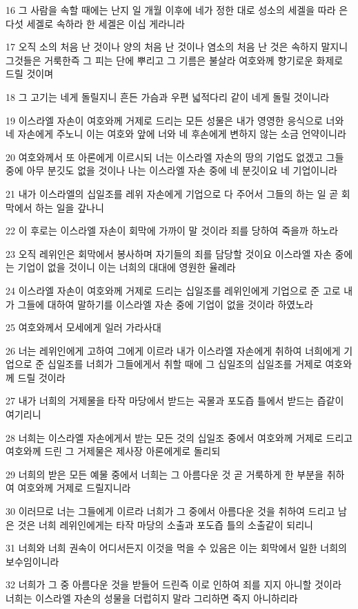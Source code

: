 \par 16 그 사람을 속할 때에는 난지 일 개월 이후에 네가 정한 대로 성소의 세겔을 따라 은 다섯 세겔로 속하라 한 세겔은 이십 게라니라
\par 17 오직 소의 처음 난 것이나 양의 처음 난 것이나 염소의 처음 난 것은 속하지 말지니 그것들은 거룩한즉 그 피는 단에 뿌리고 그 기름은 불살라 여호와께 향기로운 화제로 드릴 것이며
\par 18 그 고기는 네게 돌릴지니 흔든 가슴과 우편 넓적다리 같이 네게 돌릴 것이니라
\par 19 이스라엘 자손이 여호와께 거제로 드리는 모든 성물은 내가 영영한 응식으로 너와 네 자손에게 주노니 이는 여호와 앞에 너와 네 후손에게 변하지 않는 소금 언약이니라
\par 20 여호와께서 또 아론에게 이르시되 너는 이스라엘 자손의 땅의 기업도 없겠고 그들 중에 아무 분깃도 없을 것이나 나는 이스라엘 자손 중에 네 분깃이요 네 기업이니라
\par 21 내가 이스라엘의 십일조를 레위 자손에게 기업으로 다 주어서 그들의 하는 일 곧 회막에서 하는 일을 갚나니
\par 22 이 후로는 이스라엘 자손이 회막에 가까이 말 것이라 죄를 당하여 죽을까 하노라
\par 23 오직 레위인은 회막에서 봉사하며 자기들의 죄를 담당할 것이요 이스라엘 자손 중에는 기업이 없을 것이니 이는 너희의 대대에 영원한 율례라
\par 24 이스라엘 자손이 여호와께 거제로 드리는 십일조를 레위인에게 기업으로 준 고로 내가 그들에 대하여 말하기를 이스라엘 자손 중에 기업이 없을 것이라 하였노라
\par 25 여호와께서 모세에게 일러 가라사대
\par 26 너는 레위인에게 고하여 그에게 이르라 내가 이스라엘 자손에게 취하여 너희에게 기업으로 준 십일조를 너희가 그들에게서 취할 때에 그 십일조의 십일조를 거제로 여호와께 드릴 것이라
\par 27 내가 너희의 거제물을 타작 마당에서 받드는 곡물과 포도즙 틀에서 받드는 즙같이 여기리니
\par 28 너희는 이스라엘 자손에게서 받는 모든 것의 십일조 중에서 여호와께 거제로 드리고 여호와께 드린 그 거제물은 제사장 아론에게로 돌리되
\par 29 너희의 받은 모든 예물 중에서 너희는 그 아름다운 것 곧 거룩하게 한 부분을 취하여 여호와께 거제로 드릴지니라
\par 30 이러므로 너는 그들에게 이르라 너희가 그 중에서 아름다운 것을 취하여 드리고 남은 것은 너희 레위인에게는 타작 마당의 소출과 포도즙 틀의 소출같이 되리니
\par 31 너희와 너희 권속이 어디서든지 이것을 먹을 수 있음은 이는 회막에서 일한 너희의 보수임이니라
\par 32 너희가 그 중 아름다운 것을 받들어 드린즉 이로 인하여 죄를 지지 아니할 것이라 너희는 이스라엘 자손의 성물을 더럽히지 말라 그리하면 죽지 아니하리라

